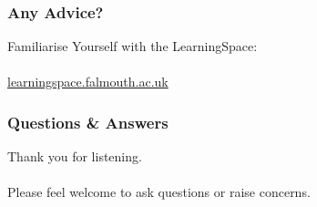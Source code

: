 \begin{frame}
	\frametitle{Any Advice?}	
	
	Familiarise Yourself with the LearningSpace:
	\\~\\
	\url{learningspace.falmouth.ac.uk}
\end{frame}

\begin{frame}
	\frametitle{Questions \& Answers}	
	\begin{center}
		Thank you for listening. 
		\\~\\
		Please feel welcome to ask questions or raise concerns.
	\end{center}
\end{frame}


